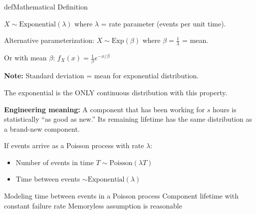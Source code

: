 \begin{PSbox}[unbreakable]{def}{Mathematical Definition}

$X \sim \mathrm{Exponential}(\lambda)$ where $\lambda$ = rate parameter (events per unit time).

Alternative parameterization: $X \sim \mathrm{Exp}(\beta)$ where $\beta = \frac{1}{\lambda}$ = mean.

\end{PSbox}



Or with mean $\beta$: $f_{X}(x) = \frac{1}{\beta}e^{-x/\beta}$







\textbf{Note:} Standard deviation = mean for exponential distribution.



The exponential is the ONLY continuous distribution with this property.

\textbf{Engineering meaning:} A component that has been working for $s$ hours is statistically ``as good as new.'' Its remaining lifetime has the same distribution as a brand-new component.


If events arrive as a Poisson process with rate $\lambda$:

\begin{itemize}
\tightlist
\item
  Number of events in time $T \sim \mathrm{Poisson}(\lambda T)$
\item
  Time between events $\sim \mathrm{Exponential}(\lambda)$
\end{itemize}


\PSyes{} Modeling time between events in a Poisson process\PSbr{}\PSyes{} Component lifetime with constant failure rate\PSbr{}\PSyes{} Memoryless assumption is reasonable

